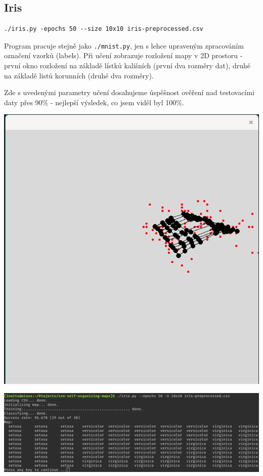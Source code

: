 \documentclass[11pt]{article}
\begin{document}
\subsection{Iris}
\label{sec:org89c915a}
\begin{verbatim}
./iris.py -epochs 50 --size 10x10 iris-preprocessed.csv
\end{verbatim}

Program pracuje stejně jako \texttt{./mnist.py}, jen s lehce upraveným zpracováním
označení vzorků (labels). Při učení zobrazuje rozložení mapy v 2D prostoru -
první okno rozložení na základě lístků kališních (první dva rozměry dat), druhé
na základě listů korunních (druhé dva rozměry).

Zde s uvedenými parametry učení dosahujeme úspěšnost ověření nad testovacími
daty přes 90\% - nejlepší výsledek, co jsem viděl byl 100\%.

\begin{center}
\includegraphics[width=.7\linewidth]{img/Screenshot from 2019-12-19 11-24-13.png}
\end{center}

\begin{center}
\includegraphics[width=1\linewidth]{img/Screenshot from 2019-12-19 11-25-49.png}
\end{center}
\end{document}
